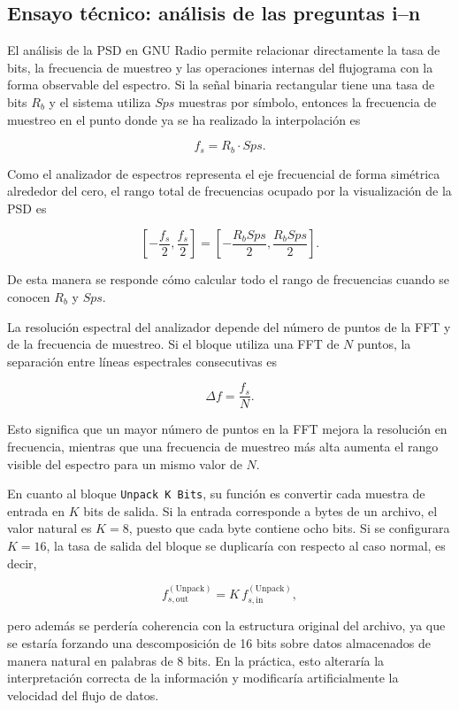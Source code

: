 \subsection{Ensayo técnico: análisis de las preguntas i--n}

El análisis de la PSD en GNU Radio permite relacionar directamente la tasa de bits, la frecuencia de muestreo y las operaciones internas del flujograma con la forma observable del espectro. Si la señal binaria rectangular tiene una tasa de bits \(R_b\) y el sistema utiliza \(Sps\) muestras por símbolo, entonces la frecuencia de muestreo en el punto donde ya se ha realizado la interpolación es

\[
f_s = R_b \cdot Sps.
\]

Como el analizador de espectros representa el eje frecuencial de forma simétrica alrededor del cero, el rango total de frecuencias ocupado por la visualización de la PSD es

\[
\left[-\frac{f_s}{2},\frac{f_s}{2}\right]
=
\left[-\frac{R_b Sps}{2},\frac{R_b Sps}{2}\right].
\]

De esta manera se responde cómo calcular todo el rango de frecuencias cuando se conocen \(R_b\) y \(Sps\).

La resolución espectral del analizador depende del número de puntos de la FFT y de la frecuencia de muestreo. Si el bloque utiliza una FFT de \(N\) puntos, la separación entre líneas espectrales consecutivas es

\[
\Delta f = \frac{f_s}{N}.
\]

Esto significa que un mayor número de puntos en la FFT mejora la resolución en frecuencia, mientras que una frecuencia de muestreo más alta aumenta el rango visible del espectro para un mismo valor de \(N\).

En cuanto al bloque \texttt{Unpack K Bits}, su función es convertir cada muestra de entrada en \(K\) bits de salida. Si la entrada corresponde a bytes de un archivo, el valor natural es \(K=8\), puesto que cada byte contiene ocho bits. Si se configurara \(K=16\), la tasa de salida del bloque se duplicaría con respecto al caso normal, es decir,

\[
f_{s,\text{out}}^{(\text{Unpack})} = K\,f_{s,\text{in}}^{(\text{Unpack})},
\]

pero además se perdería coherencia con la estructura original del archivo, ya que se estaría forzando una descomposición de 16 bits sobre datos almacenados de manera natural en palabras de 8 bits. En la práctica, esto alteraría la interpretación correcta de la información y modificaría artificialmente la velocidad del flujo de datos.


